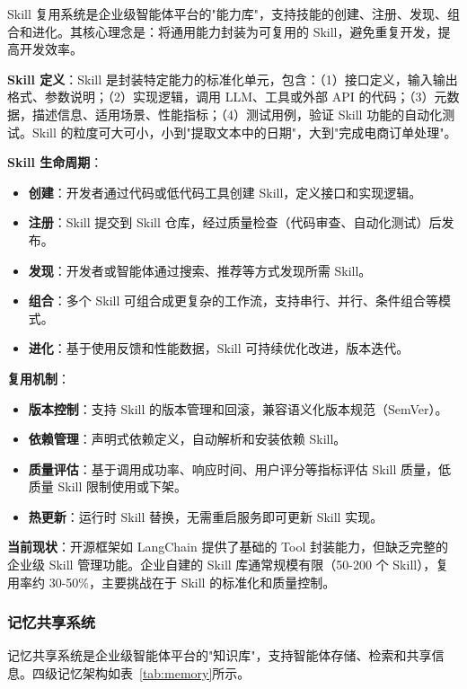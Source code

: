 \documentclass[12pt,a4paper]{article}
\begin{document}
Skill 复用系统是企业级智能体平台的"能力库"，支持技能的创建、注册、发现、组合和进化。其核心理念是：将通用能力封装为可复用的 Skill，避免重复开发，提高开发效率。

\textbf{Skill 定义}：Skill 是封装特定能力的标准化单元，包含：（1）接口定义，输入输出格式、参数说明；（2）实现逻辑，调用 LLM、工具或外部 API 的代码；（3）元数据，描述信息、适用场景、性能指标；（4）测试用例，验证 Skill 功能的自动化测试。Skill 的粒度可大可小，小到"提取文本中的日期"，大到"完成电商订单处理"。

\textbf{Skill 生命周期}：
\begin{itemize}
    \item \textbf{创建}：开发者通过代码或低代码工具创建 Skill，定义接口和实现逻辑。
    \item \textbf{注册}：Skill 提交到 Skill 仓库，经过质量检查（代码审查、自动化测试）后发布。
    \item \textbf{发现}：开发者或智能体通过搜索、推荐等方式发现所需 Skill。
    \item \textbf{组合}：多个 Skill 可组合成更复杂的工作流，支持串行、并行、条件组合等模式。
    \item \textbf{进化}：基于使用反馈和性能数据，Skill 可持续优化改进，版本迭代。
\end{itemize}

\textbf{复用机制}：
\begin{itemize}
    \item \textbf{版本控制}：支持 Skill 的版本管理和回滚，兼容语义化版本规范（SemVer）。
    \item \textbf{依赖管理}：声明式依赖定义，自动解析和安装依赖 Skill。
    \item \textbf{质量评估}：基于调用成功率、响应时间、用户评分等指标评估 Skill 质量，低质量 Skill 限制使用或下架。
    \item \textbf{热更新}：运行时 Skill 替换，无需重启服务即可更新 Skill 实现。
\end{itemize}

\textbf{当前现状}：开源框架如 LangChain 提供了基础的 Tool 封装能力，但缺乏完整的企业级 Skill 管理功能。企业自建的 Skill 库通常规模有限（50-200 个 Skill），复用率约 30-50\%，主要挑战在于 Skill 的标准化和质量控制。

\subsubsection{记忆共享系统}

记忆共享系统是企业级智能体平台的"知识库"，支持智能体存储、检索和共享信息。四级记忆架构如表~\ref{tab:memory}所示。
\end{document}
